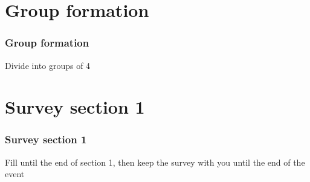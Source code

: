 \documentclass{beamer}
\begin{document}
\section{Group formation}
\begin{frame}
\frametitle{Group formation}
Divide into groups of 4
\begin{figure}

\end{figure}
\end{frame}

\section{Survey section 1}
\begin{frame}
\frametitle{Survey section 1}
Fill until the end of section 1, then keep the survey with you until the end of the event
\begin{figure}
\end{figure}
\end{frame}
\end{document}
